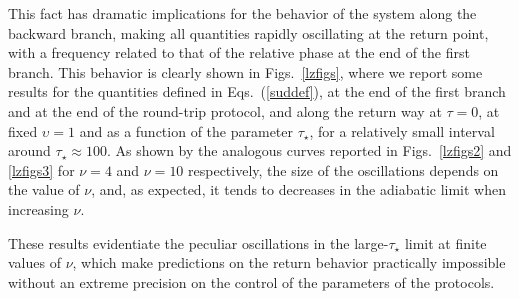 This fact has dramatic implications for the behavior of the system
along the backward branch, making all quantities rapidly oscillating
at the return point, with a frequency related to that of the relative
phase at the end of the first branch.  This behavior is clearly shown
in Figs.~\ref{lzfigs}, where we report some results for the quantities
defined in Eqs.~(\ref{suddef}), at the end of the first branch and at
the end of the round-trip protocol, and along the return way at
$\tau=0$, at fixed $\upsilon=1$ and as a function of the parameter
$\tau_\star$, for a relatively small interval around
$\tau_\star\approx 100$. As shown by the analogous curves reported in
Figs.~\ref{lzfigs2} and \ref{lzfigs3} for $\nu=4$ and $\nu=10$
respectively, the size of the oscillations depends on the value of
$\nu$, and, as expected, it tends to decreases in the adiabatic limit
when increasing $\nu$.

These results evidentiate the peculiar oscillations in the
large-$\tau_\star$ limit at finite values of $\nu$, which make
predictions on the return behavior practically impossible without an
extreme precision on the control of the parameters of the protocols.

